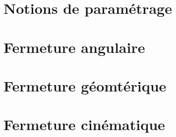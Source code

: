 \def\xxactivite{Cours}
\def\xxauteur{\textsl{Xavier Pessoles}}

\fichetrue
\proftrue
\tdfalse
\coursfalse


\def\xxcompetences{%
\textsl{%
\textbf{Savoirs et compétences :}\\
\begin{itemize}[label=\ding{112},font=\color{ocre}] 
\item **\textit{Mod2.C1 : }Chaîne d’énergie et d'information
\end{itemize}
}}

\def\xxfigures{
\\
}%


\iflivret

\else

\fi
\setlength{\columnseprule}{.1pt}

\vspace{2cm}
\pagestyle{fancy}
\thispagestyle{plain}



\setcounter{section}{0}
\section{Notions de paramétrage}
\section{Fermeture angulaire}
\section{Fermeture géomtérique}
\section{Fermeture cinématique}


%
%
%
